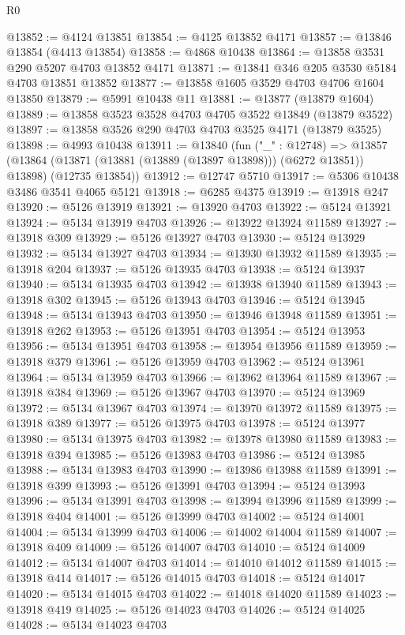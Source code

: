 \begin{lexlean}{R0}
\begin{coremodule}
@13852 := @4124 @13851
@13854 := @4125 @13852 @4171
@13857 := @13846 @13854 (@4413 @13854)
@13858 := @4868 @10438
@13864 := @13858 @3531 @290 @5207 @4703 @13852 @4171
@13871 := @13841 @346 @205 @3530 @5184 @4703 @13851 @13852
@13877 := @13858 @1605 @3529 @4703 @4706 @1604 @13850
@13879 := @5991 @10438 @11
@13881 := @13877 (@13879 @1604)
@13889 := @13858 @3523 @3528 @4703 @4705 @3522 @13849 (@13879 @3522)
@13897 := @13858 @3526 @290 @4703 @4703 @3525 @4171 (@13879 @3525)
@13898 := @4993 @10438
@13911 := @13840
    (fun ("_" : @12748) =>
    @13857
      (@13864 (@13871 (@13881 (@13889 (@13897 @13898))) (@6272 @13851)) @13898)
      (@12735 @13854))
@13912 := @12747 @5710
@13917 := @5306 @10438 @3486 @3541 @4065 @5121
@13918 := @6285 @4375
@13919 := @13918 @247
@13920 := @5126 @13919
@13921 := @13920 @4703
@13922 := @5124 @13921
@13924 := @5134 @13919 @4703
@13926 := @13922 @13924 @11589
@13927 := @13918 @309
@13929 := @5126 @13927 @4703
@13930 := @5124 @13929
@13932 := @5134 @13927 @4703
@13934 := @13930 @13932 @11589
@13935 := @13918 @204
@13937 := @5126 @13935 @4703
@13938 := @5124 @13937
@13940 := @5134 @13935 @4703
@13942 := @13938 @13940 @11589
@13943 := @13918 @302
@13945 := @5126 @13943 @4703
@13946 := @5124 @13945
@13948 := @5134 @13943 @4703
@13950 := @13946 @13948 @11589
@13951 := @13918 @262
@13953 := @5126 @13951 @4703
@13954 := @5124 @13953
@13956 := @5134 @13951 @4703
@13958 := @13954 @13956 @11589
@13959 := @13918 @379
@13961 := @5126 @13959 @4703
@13962 := @5124 @13961
@13964 := @5134 @13959 @4703
@13966 := @13962 @13964 @11589
@13967 := @13918 @384
@13969 := @5126 @13967 @4703
@13970 := @5124 @13969
@13972 := @5134 @13967 @4703
@13974 := @13970 @13972 @11589
@13975 := @13918 @389
@13977 := @5126 @13975 @4703
@13978 := @5124 @13977
@13980 := @5134 @13975 @4703
@13982 := @13978 @13980 @11589
@13983 := @13918 @394
@13985 := @5126 @13983 @4703
@13986 := @5124 @13985
@13988 := @5134 @13983 @4703
@13990 := @13986 @13988 @11589
@13991 := @13918 @399
@13993 := @5126 @13991 @4703
@13994 := @5124 @13993
@13996 := @5134 @13991 @4703
@13998 := @13994 @13996 @11589
@13999 := @13918 @404
@14001 := @5126 @13999 @4703
@14002 := @5124 @14001
@14004 := @5134 @13999 @4703
@14006 := @14002 @14004 @11589
@14007 := @13918 @409
@14009 := @5126 @14007 @4703
@14010 := @5124 @14009
@14012 := @5134 @14007 @4703
@14014 := @14010 @14012 @11589
@14015 := @13918 @414
@14017 := @5126 @14015 @4703
@14018 := @5124 @14017
@14020 := @5134 @14015 @4703
@14022 := @14018 @14020 @11589
@14023 := @13918 @419
@14025 := @5126 @14023 @4703
@14026 := @5124 @14025
@14028 := @5134 @14023 @4703

\end{coremodule}
\end{lexlean}
